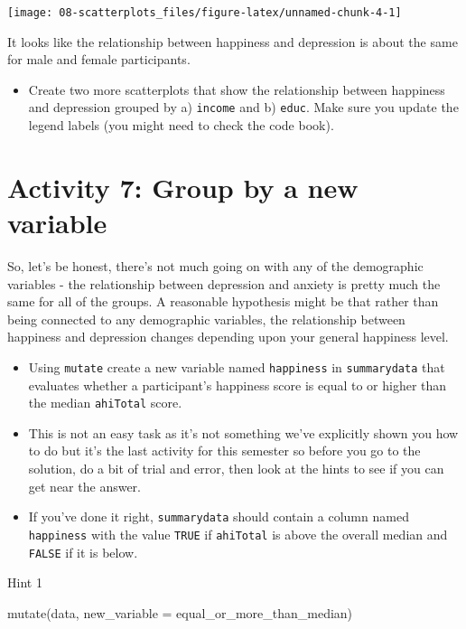\documentclass[
  oneside]{book}
\newenvironment{Shaded}{\begin{snugshade}}{\end{snugshade}}
\newcommand{\AttributeTok}[1]{\textcolor[rgb]{0.77,0.63,0.00}{#1}}
\newcommand{\FunctionTok}[1]{\textcolor[rgb]{0.00,0.00,0.00}{#1}}
\newcommand{\NormalTok}[1]{#1}
\providecommand{\tightlist}{%
  \setlength{\itemsep}{0pt}\setlength{\parskip}{0pt}}
\begin{document}
\begin{center}\texttt{[image: 08-scatterplots\_files/figure-latex/unnamed-chunk-4-1]} \end{center}

It looks like the relationship between happiness and depression is about the same for male and female participants.

\begin{itemize}
\tightlist
\item
  Create two more scatterplots that show the relationship between happiness and depression grouped by a) \texttt{income} and b) \texttt{educ}. Make sure you update the legend labels (you might need to check the code book).
\end{itemize}

\hypertarget{activity-7-group-by-a-new-variable}{%
\section{Activity 7: Group by a new variable}\label{activity-7-group-by-a-new-variable}}

So, let's be honest, there's not much going on with any of the demographic variables - the relationship between depression and anxiety is pretty much the same for all of the groups. A reasonable hypothesis might be that rather than being connected to any demographic variables, the relationship between happiness and depression changes depending upon your general happiness level.

\begin{itemize}
\tightlist
\item
  Using \texttt{mutate} create a new variable named \texttt{happiness} in \texttt{summarydata} that evaluates whether a participant's happiness score is equal to or higher than the median \texttt{ahiTotal} score.
\item
  This is not an easy task as it's not something we've explicitly shown you how to do but it's the last activity for this semester so before you go to the solution, do a bit of trial and error, then look at the hints to see if you can get near the answer.
\item
  If you've done it right, \texttt{summarydata} should contain a column named \texttt{happiness} with the value \texttt{TRUE} if \texttt{ahiTotal} is above the overall median and \texttt{FALSE} if it is below.
\end{itemize}

Hint 1

\begin{Shaded}
\begin{Highlighting}[]
\FunctionTok{mutate}\NormalTok{(data, }\AttributeTok{new\_variable =}\NormalTok{ equal\_or\_more\_than\_median)}
\end{Highlighting}
\end{Shaded}
\end{document}
